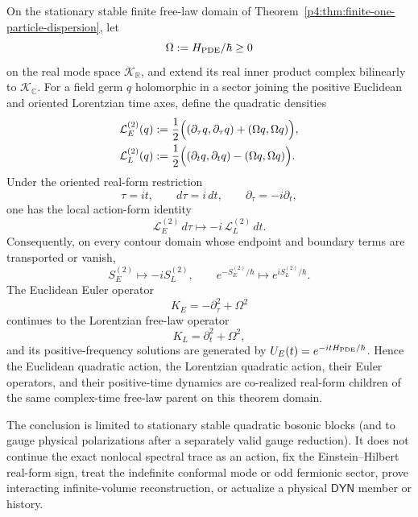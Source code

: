 \documentclass[12pt,a4paper]{article}
\begin{document}
\begin{theorem}
\label{p4:thm:stationary-quadratic-real-form-pair}
On the stationary stable finite free-law domain of
Theorem~\ref{p4:thm:finite-one-particle-dispersion}, let
\[
 \Omega:=H_{\rm PDE}/\hbar\ge0
\]
on the real mode space \(\mathcal K_{\mathbb R}\), and extend its real inner
product complex bilinearly to \(\mathcal K_{\mathbb C}\).  For a field germ
\(q\) holomorphic in a sector joining the positive Euclidean and oriented
Lorentzian time axes, define the quadratic densities
\begin{align}
\label{p4:eq:stationary-quadratic-real-form-actions}
 \mathcal L_E^{(2)}(q)
 &:=\frac12\Bigl(
   (\partial_\tau q,\partial_\tau q)
   +(\Omega q,\Omega q)\Bigr),\\
 \mathcal L_L^{(2)}(q)
 &:=\frac12\Bigl(
   (\partial_t q,\partial_t q)
   -(\Omega q,\Omega q)\Bigr).
\end{align}
Under the oriented real-form restriction
\begin{equation}
\label{p4:eq:stationary-quadratic-wick-map}
 \tau=it,
 \qquad
 d\tau=i\,dt,
 \qquad
 \partial_\tau=-i\partial_t,
\end{equation}
one has the local action-form identity
\begin{equation}
\label{p4:eq:stationary-quadratic-action-form-identity}
 \mathcal L_E^{(2)}\,d\tau
 \longmapsto
 -i\,\mathcal L_L^{(2)}\,dt.
\end{equation}
Consequently, on every contour domain whose endpoint and boundary terms are
transported or vanish,
\begin{equation}
\label{p4:eq:stationary-quadratic-weight-identity}
 S_E^{(2)}\longmapsto-iS_L^{(2)},
 \qquad
 e^{-S_E^{(2)}/\hbar}\longmapsto e^{iS_L^{(2)}/\hbar}.
\end{equation}
The Euclidean Euler operator
\begin{equation}
\label{p4:eq:stationary-quadratic-euler-pair}
 K_E=-\partial_\tau^2+\Omega^2
\end{equation}
continues to the Lorentzian free-law operator
\[
 K_L=\partial_t^2+\Omega^2,
\]
and its positive-frequency solutions are generated by
\(U_E(t)=e^{-itH_{\rm PDE}/\hbar}\).  Hence the Euclidean quadratic action,
the Lorentzian quadratic action, their Euler operators, and their
positive-time dynamics are co-realized real-form children of the same
complex-time free-law parent on this theorem domain.

The conclusion is limited to stationary stable quadratic bosonic blocks (and
to gauge physical polarizations after a separately valid gauge reduction).
It does not continue the exact nonlocal spectral trace as an action, fix the
Einstein--Hilbert real-form sign, treat the indefinite conformal mode or odd
fermionic sector, prove interacting infinite-volume reconstruction, or
actualize a physical \(\mathsf{DYN}\) member or history.
\end{theorem}
\end{document}
